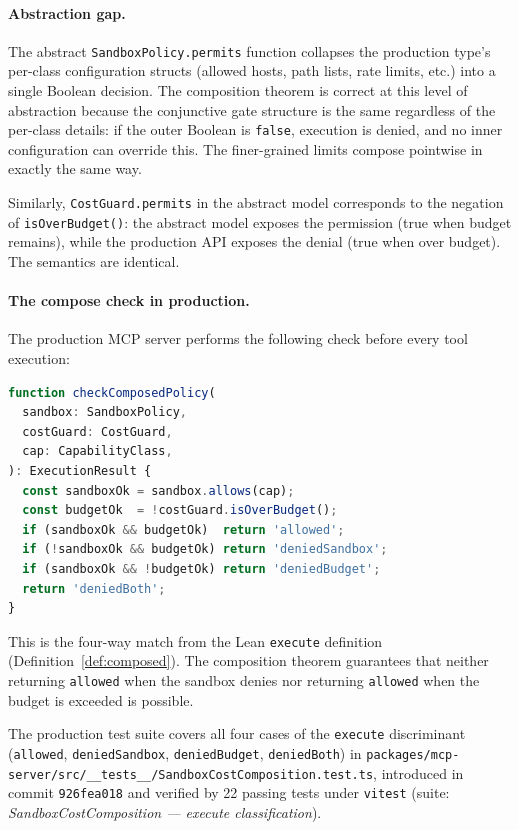 \documentclass[sigconf]{acmart}
\begin{document}
\paragraph{Abstraction gap.}
The abstract \texttt{SandboxPolicy.permits} function collapses the production
type's per-class configuration structs (allowed hosts, path lists, rate limits,
etc.) into a single Boolean decision.  The composition theorem is correct at
this level of abstraction because the conjunctive gate structure is the same
regardless of the per-class details: if the outer Boolean is \texttt{false},
execution is denied, and no inner configuration can override this.  The
finer-grained limits compose pointwise in exactly the same way.

Similarly, \texttt{CostGuard.permits} in the abstract model corresponds to the
negation of \texttt{isOverBudget()}: the abstract model exposes the permission
(true when budget remains), while the production API exposes the denial (true
when over budget).  The semantics are identical.

\paragraph{The compose check in production.}
The production MCP server performs the following check before every tool
execution:

\begin{lstlisting}[language=TypeScript,caption={Production compose check (simplified)}]
function checkComposedPolicy(
  sandbox: SandboxPolicy,
  costGuard: CostGuard,
  cap: CapabilityClass,
): ExecutionResult {
  const sandboxOk = sandbox.allows(cap);
  const budgetOk  = !costGuard.isOverBudget();
  if (sandboxOk && budgetOk)  return 'allowed';
  if (!sandboxOk && budgetOk) return 'deniedSandbox';
  if (sandboxOk && !budgetOk) return 'deniedBudget';
  return 'deniedBoth';
}
\end{lstlisting}

This is the four-way match from the Lean \texttt{execute} definition
(Definition~\ref{def:composed}).  The composition theorem guarantees that
neither returning \texttt{allowed} when the sandbox denies nor returning
\texttt{allowed} when the budget is exceeded is possible.

The production test suite covers all four cases of the \texttt{execute}
discriminant (\texttt{allowed}, \texttt{deniedSandbox}, \texttt{deniedBudget},
\texttt{deniedBoth}) in
\texttt{packages/mcp-server/src/\_\_tests\_\_/\allowbreak SandboxCostComposition.test.ts},
introduced in commit \texttt{926fea018} and verified by 22 passing tests under
\texttt{vitest} (suite: \emph{SandboxCostComposition --- execute classification}).
\end{document}
